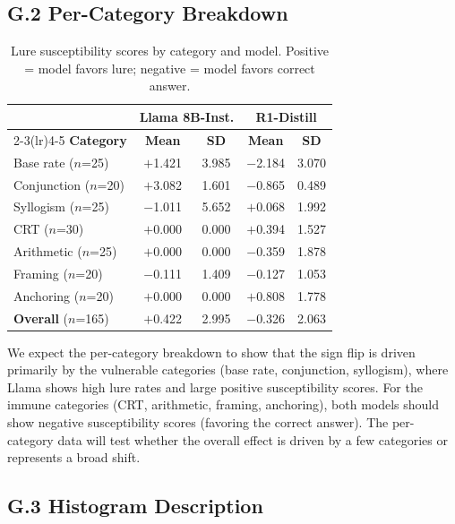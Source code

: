 \documentclass{article}
\begin{document}
\subsection*{G.2 Per-Category Breakdown}

\begin{table}[ht]
\centering
\caption{Lure susceptibility scores by category and model.
  Positive = model favors lure; negative = model favors correct
  answer.}
\label{tab:lure_by_category}
\vspace{4pt}
\small
\begin{tabular}{lcccc}
\toprule
& \multicolumn{2}{c}{\textbf{Llama 8B-Inst.}} & \multicolumn{2}{c}{\textbf{R1-Distill}} \\
\cmidrule(lr){2-3}\cmidrule(lr){4-5}
\textbf{Category} & \textbf{Mean} & \textbf{SD} & \textbf{Mean} & \textbf{SD} \\
\midrule
Base rate ($n$=25)    & $+$1.421 & 3.985 & $-$2.184 & 3.070 \\
Conjunction ($n$=20)  & $+$3.082 & 1.601 & $-$0.865 & 0.489 \\
Syllogism ($n$=25)    & $-$1.011 & 5.652 & $+$0.068 & 1.992 \\
CRT ($n$=30)          & $+$0.000 & 0.000 & $+$0.394 & 1.527 \\
Arithmetic ($n$=25)   & $+$0.000 & 0.000 & $-$0.359 & 1.878 \\
Framing ($n$=20)      & $-$0.111 & 1.409 & $-$0.127 & 1.053 \\
Anchoring ($n$=20)    & $+$0.000 & 0.000 & $+$0.808 & 1.778 \\
\midrule
\textbf{Overall} ($n$=165) & $+$0.422 & 2.995 & $-$0.326 & 2.063 \\
\bottomrule
\end{tabular}
\end{table}

\noindent We expect the per-category breakdown to show that the
sign flip is driven primarily by the vulnerable categories (base
rate, conjunction, syllogism), where Llama shows high lure rates
and large positive susceptibility scores.  For the immune categories
(CRT, arithmetic, framing, anchoring), both models should show
negative susceptibility scores (favoring the correct answer).  The
per-category data will test whether the overall effect is driven by
a few categories or represents a broad shift.

\subsection*{G.3 Histogram Description}
\end{document}
